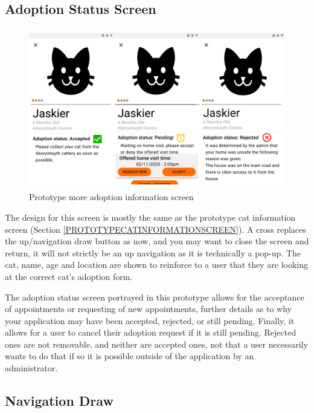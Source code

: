 \subsection{Adoption Status Screen} \label{PROTOTYPEADOPTIONSTATUSINFOMATION}

\begin{figure} [htbp!]
    \centering
    \includegraphics[height=7cm]{Images/PrototypeAdoptionStatusInfomation.png}
    \caption{Prototype more adoption information screen}
    \label{fig:prototype_adoption_status_infomation}
\end{figure}

The design for this screen is mostly the same as the prototype cat information screen (Section \ref{PROTOTYPECATINFORMATIONSCREEN}). A cross replaces the up/navigation draw button as now, and you may want to close the screen and return, it will not strictly be an up navigation as it is technically a pop-up. The cat, name, age and location are shown to reinforce to a user that they are looking at the correct cat's adoption form.

The adoption status screen portrayed in this prototype allows for the acceptance of appointments or requesting of new appointments, further details as to why your application may have been accepted, rejected, or still pending. Finally, it allows for a user to cancel their adoption request if it is still pending. Rejected ones are not removable, and neither are accepted ones, not that a user necessarily wants to do that if so it is possible outside of the application by an administrator.

\subsection{Navigation Draw} \label{PROTOTYPENAVIGATIONDRAW}


